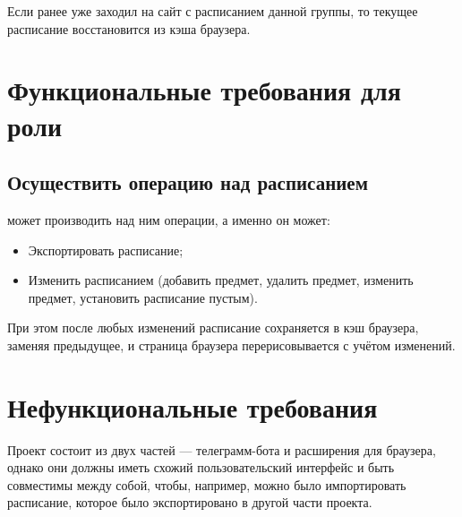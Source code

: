 			Если  ранее уже заходил на сайт с расписанием данной группы, то текущее расписание восстановится из кэша браузера.
	\section{Функциональные требования для роли }
		\subsection{Осуществить операцию над расписанием}
			 может производить над ним операции, а именно он может:
			\begin{itemize}
				\item Экспортировать расписание;
					
				\item Изменить расписанием (добавить предмет, удалить предмет, изменить предмет, установить расписание пустым).
			\end{itemize}
			
			При этом после любых изменений расписание сохраняется в кэш браузера, заменяя предыдущее, и страница браузера перерисовывается с учётом изменений.
	\section{Нефункциональные требования}
		Проект состоит из двух частей --- телеграмм-бота и расширения для браузера, однако они должны иметь схожий пользовательский интерфейс и быть совместимы между собой, чтобы, например, можно было импортировать расписание, которое было экспортировано в другой части проекта.
